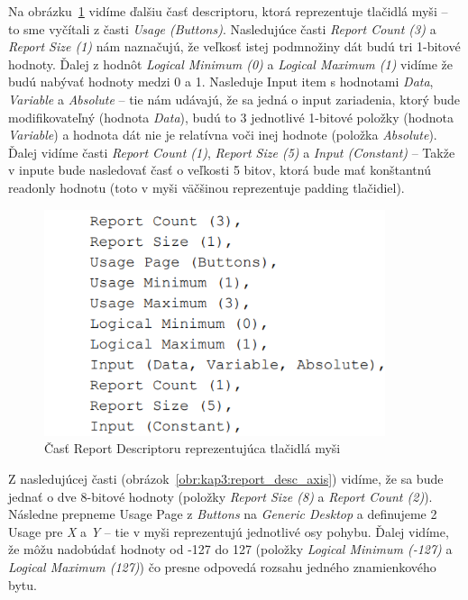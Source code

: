 Na obrázku~\ref{obr:kap3:report_desc_buttons} vidíme ďalšiu časť descriptoru, ktorá reprezentuje tlačidlá myši -- to sme vyčítali z časti \textit{Usage (Buttons)}. Nasledujúce časti \textit{Report Count (3)} a \textit{Report Size (1)} nám naznačujú, že veľkosť istej podmnožiny dát budú tri 1-bitové hodnoty. Ďalej z hodnôt \textit{Logical Minimum (0)} a \textit{Logical Maximum (1)} vidíme že budú nabývať hodnoty medzi 0 a 1. Nasleduje Input item s hodnotami \textit{Data}, \textit{Variable} a \textit{Absolute} -- tie nám udávajú, že sa jedná o input zariadenia, ktorý bude modifikovateľný (hodnota \textit{Data}), budú to 3 jednotlivé 1-bitové položky (hodnota \textit{Variable}) a hodnota dát nie je relatívna voči inej hodnote (položka \textit{Absolute}). Ďalej vidíme časti \textit{Report Count (1)}, \textit{Report Size (5)} a \textit{Input (Constant)} -- Takže v inpute bude nasledovať časť o veľkosti 5 bitov, ktorá bude mať konštantnú readonly hodnotu (toto v myši väčšinou reprezentuje padding tlačidiel).

\begin{figure}[!htb]
	\centering
	\includegraphics[width=10cm]{img/kap03_report_desc_buttons}
	\caption{Časť Report Descriptoru reprezentujúca tlačidlá myši}
	\label{obr:kap3:report_desc_buttons}
\end{figure}

Z nasledujúcej časti (obrázok~\ref{obr:kap3:report_desc_axis}) vidíme, že sa bude jednať o dve 8-bitové hodnoty (položky \textit{Report Size (8)} a \textit{Report Count (2)}). Následne prepneme Usage Page z \textit{Buttons} na \textit{Generic Desktop} a definujeme 2 Usage pre \textit{X} a \textit{Y} -- tie v myši reprezentujú jednotlivé osy pohybu. Ďalej vidíme, že môžu nadobúdať hodnoty od -127 do 127 (položky \textit{Logical Minimum (-127)} a \textit{Logical Maximum (127)}) čo presne odpovedá rozsahu jedného znamienkového bytu.

